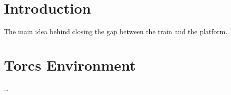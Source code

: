 \documentclass[declaration,shortabstract,english,inz]{iithesis}
\author         {Kacper Kulczak}
\begin{document}

\chapter{Introduction}
The main idea behind closing the gap between the train and the platform.


\chapter{Torcs Environment}


\ldots


\end{document}
